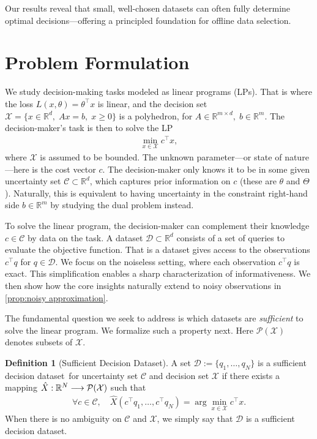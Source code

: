 \documentclass[11pt]{article}
\theoremstyle{plain}
\theoremstyle{definition}
\newtheorem{definition}{Definition}
\newcommand{\R}[0]{\mathbb R}
\newcommand{\sufficient}{sufficient decision dataset}
\newcommand{\Sufficient}{Sufficient Decision Dataset}
\newcommand{\cX}{\mathcal{X}}
\newcommand{\cC}{\mathcal{C}}
\newcommand{\cD}{\mathcal{D}}
\newcommand{\cP}{\mathcal{P}}
\renewcommand{\Re}{\mathbb{R}}
\begin{document}
Our results reveal that small, well-chosen datasets can often fully determine optimal decisions---offering a principled foundation for offline data selection.




\section{Problem Formulation}\label{sec:problem-formulation}

We study decision-making tasks modeled as linear programs (LPs). That is where the loss $L(x,\theta) = \theta^\top x$ is linear, and the decision set $\cX=\{x\in \R^d,\; Ax=b,\; x\geq 0\}$ is a polyhedron, for $A\in \R^{m\times d},\; b\in \R^m$.
The decision-maker's task is then to solve the LP 
\begin{align}
    \min_{x\in \cX}c^\top x,\label{mainproblem}
\end{align}
where $\cX$ is assumed to be bounded.
The unknown parameter---or state of nature---here is the cost vector $c$.
The decision-maker only knows it to be in some given uncertainty set $\cC\subset \R^d$, which captures prior information on $c$ (these are $\theta$ and $\Theta$). Naturally, this is equivalent to having uncertainty in the constraint right-hand side $b \in \Re^m$ by studying the dual problem instead.

To solve the linear program, the decision-maker can complement their knowledge $c \in \cC$ by data on the task.
A dataset $\cD \subset \R^d$ consists of a set of queries to evaluate the objective function. That is a dataset gives access to the observations $c^\top q$ for $q\in \cD$. We focus on the noiseless setting, where each observation $c^\top q$ is exact. This simplification enables a sharp characterization of informativeness. We then show how the core insights naturally extend to noisy observations in \cref{prop:noisy approximation}.

The fundamental question we seek to address is which datasets are \textit{sufficient} to solve the linear program. We formalize such a property next. 
Here $\cP(\cX)$ denotes subsets of $\cX$.

\begin{definition}[\Sufficient] \label{def:sufficient}
    A set $\cD:=\{q_1,\dots,q_N\}$ is a \sufficient\ for uncertainty set $\cC$ and decision set $\cX$ if there exists a mapping $\hat X:\R^{N} \longrightarrow \cal P(\cX)$ such that
    \begin{align*}
        \forall c \in \cC, \quad \hat X\left(c^\top q_1,\dots,c^\top q_N\right)=\arg\min_{x\in \cX}c^\top x.
    \end{align*}
When there is no ambiguity on $\cC$ and $\cX$, we simply say that $\mathcal D$ is a \sufficient{}.
\end{definition}
\end{document}
